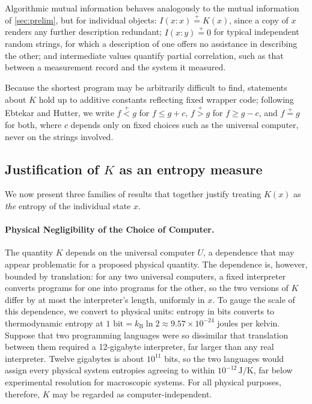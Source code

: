 \documentclass[11pt]{article}
\newcommand{\plt}{\mathrel{\stackrel{+}{<}}}
\newcommand{\pgt}{\mathrel{\stackrel{+}{>}}}
\newcommand{\peq}{\mathrel{\stackrel{+}{=}}}
\newcommand{\kB}{k_{\mathrm{B}}}
\begin{document}
Algorithmic mutual information behaves analogously to the mutual information of \cref{sec:prelim}, but for individual objects: $I(x : x) \peq K(x)$, since a copy of $x$ renders any further description redundant; $I(x : y) \peq 0$ for typical independent random strings, for which a description of one offers no assistance in describing the other; and intermediate values quantify partial correlation, such as that between a measurement record and the system it measured.

Because the shortest program may be arbitrarily difficult to find, statements about $K$ hold up to additive constants reflecting fixed wrapper code; following Ebtekar and Hutter, we write $f \plt g$ for $f \le g + c$, $f \pgt g$ for $f \ge g - c$, and $f \peq g$ for both, where $c$ depends only on fixed choices such as the universal computer, never on the strings involved.

\subsection{Justification of $K$ as an entropy measure}
\label{sec:Kjustified}

We now present three families of results that together justify treating $K(x)$ as \emph{the} entropy of the individual state $x$.

\paragraph{Physical Negligibility of the Choice of Computer.} The quantity $K$ depends on the universal computer $U$, a dependence that may appear problematic for a proposed physical quantity. The dependence is, however, bounded by translation: for any two universal computers, a fixed interpreter converts programs for one into programs for the other, so the two versions of $K$ differ by at most the interpreter's length, uniformly in $x$. To gauge the scale of this dependence, we convert to physical units: entropy in bits converts to thermodynamic entropy at $1 \text{ bit} = \kB \ln 2 \approx 9.57 \times 10^{-24}$ joules per kelvin. Suppose that two programming languages were so dissimilar that translation between them required a 12-gigabyte interpreter, far larger than any real interpreter. Twelve gigabytes is about $10^{11}$ bits, so the two languages would assign every physical system entropies agreeing to within $10^{-12}\,\mathrm{J/K}$, far below experimental resolution for macroscopic systems. For all physical purposes, therefore, $K$ may be regarded as computer-independent.
\end{document}
